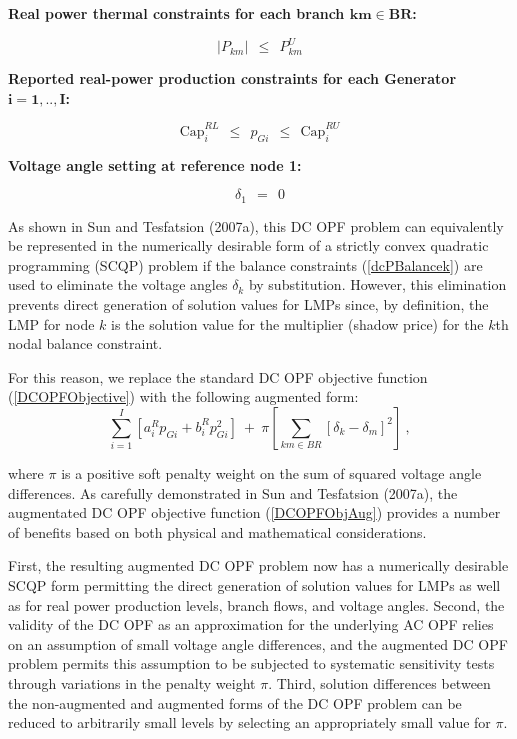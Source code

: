 \documentclass[12pt]{article}
\begin{document}
\vspace{10pt}
\textbf{Real power thermal constraints for each branch $\mathbf{km \in BR}$:}

\begin{equation}  \label{dcSkmLimit}
|P_{km}|  ~~  \le  ~~ P^U_{km}
\end{equation}

\vspace{10pt}
\textbf{Reported real-power production constraints for each Generator $\mathbf{i=1,..,I}$:}

               \begin{equation}  \label{dcPCapLimits}
         \mbox{Cap}^{RL}_i ~~ \le ~~  p_{Gi} ~~ \le  ~~ \mbox{Cap}^{RU}_i 
                \end{equation}

\vspace{10pt}
\textbf{Voltage angle setting at reference node 1:}

                \begin{equation}  \label{dcDeltaRefBus}
             \delta_{1} ~~ = ~~ 0
                       \end{equation}

\medskip
As shown in Sun and Tesfatsion (2007a), this DC OPF problem can equivalently be represented in the numerically desirable form of a strictly convex quadratic programming (SCQP) problem if the balance constraints (\ref{dcPBalancek}) are used to eliminate the voltage angles $\delta_k$ by substitution.  However, this elimination prevents direct generation of solution values for LMPs since, by definition, the LMP for node $k$ is the solution value for the multiplier (shadow price) for the $k$th nodal balance constraint.  

For this reason, we replace the standard DC OPF objective function (\ref{DCOPFObjective}) with the following augmented 
form:
\begin{equation} \label{DCOPFObjAug}
	\sum_{i=1}^I [a^R_i p_{Gi} + b^R_i p_{Gi}^2 ]~ + ~ \pi \left[ \sum_{km \in BR}  [\delta_k - \delta_m]^2 \right]~,
\end{equation}
  
\smallskip
\noindent
where $\pi$ is a positive soft penalty weight on the sum of squared voltage angle differences.  As carefully demonstrated in Sun and Tesfatsion (2007a), the augmentated DC OPF objective function (\ref{DCOPFObjAug}) provides a number of benefits based on both physical and mathematical considerations.  

First, the resulting augmented DC OPF problem now has a numerically desirable SCQP form permitting the direct generation of solution values for LMPs as well as for real power production levels, branch flows, and voltage angles. Second, the validity of the DC OPF as an approximation for the underlying AC OPF relies on an assumption of small voltage angle differences, and the augmented DC OPF problem permits this assumption to be subjected to systematic sensitivity tests through variations in the penalty weight $\pi$.  Third, solution differences between the non-augmented and augmented forms of the DC OPF problem can be reduced to arbitrarily small levels by selecting an appropriately small value for $\pi$. 
\end{document}
